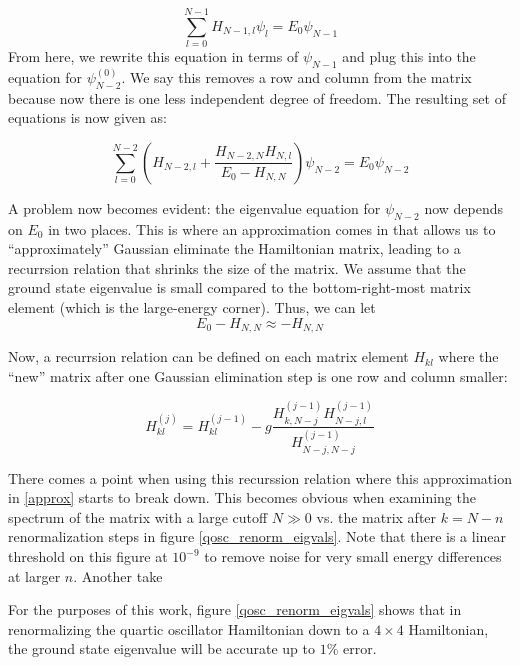 \documentclass[%
 reprint,
nofootinbib,
 amsmath,amssymb,
 aps,
]{revtex4-2}
\numberwithin{equation}{section}
\begin{document}
\begin{equation}
  \sum_{l = 0}^{N - 1} H_{N - 1, l}\psi_l = E_0\psi_{N - 1}
\end{equation}
From here, we rewrite this equation in terms of $\psi_{N - 1}$ and plug this into the equation
for $\psi^{(0)}_{N - 2}$. We say this removes a row and column from the matrix because now
there is one less independent degree of freedom. The resulting set of equations is now given
as:

\begin{equation}
  \sum_{l = 0}^{N - 2}\left(H_{N-2, l} + \frac{H_{N-2, N}H_{N, l}}{E_0 - H_{N, N}} \right)\psi_{N - 2} = E_0\psi_{N - 2}
\end{equation}

A problem now becomes evident: the eigenvalue equation for $\psi_{N - 2}$ now depends on $E_0$ in two places.
This is where an approximation comes in that allows us to ``approximately'' Gaussian eliminate the
Hamiltonian matrix, leading to a recurrsion relation that shrinks the size of the matrix. We assume
that the ground state eigenvalue is small compared to the bottom-right-most matrix element (which 
is the large-energy corner). Thus, we can let
\begin{equation}
  E_0 - H_{N, N} \approx -H_{N, N}
  \label{approx}
\end{equation}

Now, a recurrsion relation can be defined on each matrix element $H_{kl}$ where the ``new'' matrix
after one Gaussian elimination step is one row and column smaller:

\begin{equation}
  \label{recurrsion}
  H_{kl}^{(j)} = H_{kl}^{(j - 1)} - g\frac{H_{k,N-j}^{(j - 1)}H_{N-j,l}^{(j - 1)}}{H_{N-j,N-j}^{(j - 1)}}
\end{equation}

There comes a point when using this recurssion relation where this approximation in \ref{approx} starts to break down. This becomes obvious when examining the spectrum of the matrix with a large cutoff $N \gg 0$ vs. the matrix after $k = N - n$ renormalization steps in figure \ref{qosc_renorm_eigvals}.
Note that there is a linear threshold on this figure at $10^{-9}$ to remove noise for very small energy differences at larger $n$. 
Another take

For the purposes of this work, figure \ref{qosc_renorm_eigvals} shows that in renormalizing the quartic oscillator Hamiltonian down to a $4 \times 4$ Hamiltonian, the ground state eigenvalue will be accurate up to $1\%$ error. 
\end{document}
